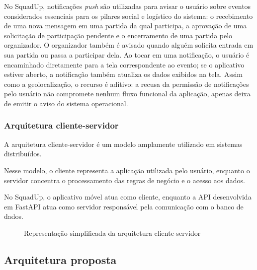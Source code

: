 \documentclass[a4paper, 12pt]{article}
\begin{document}
\begin{justify}
No SquadUp, notificações \textit{push} são utilizadas para avisar o usuário sobre eventos considerados essenciais para os pilares social e logístico do sistema: o recebimento de uma nova mensagem em uma partida da qual participa, a aprovação de uma solicitação de participação pendente e o encerramento de uma partida pelo organizador. O organizador também é avisado quando alguém solicita entrada em sua partida ou passa a participar dela. Ao tocar em uma notificação, o usuário é encaminhado diretamente para a tela correspondente ao evento; se o aplicativo estiver aberto, a notificação também atualiza os dados exibidos na tela. Assim como a geolocalização, o recurso é aditivo: a recusa da permissão de notificações pelo usuário não compromete nenhum fluxo funcional da aplicação, apenas deixa de emitir o aviso do sistema operacional.

\subsubsection{Arquitetura cliente-servidor}

A arquitetura cliente-servidor é um modelo amplamente utilizado em sistemas distribuídos.

Nesse modelo, o cliente representa a aplicação utilizada pelo usuário, enquanto o servidor concentra o processamento das regras de negócio e o acesso aos dados.

No SquadUp, o aplicativo móvel atua como cliente, enquanto a API desenvolvida em FastAPI atua como servidor responsável pela comunicação com o banco de dados.

\begin{figure}[H]
    \centering
    \caption{Representação simplificada da arquitetura cliente-servidor}
    \label{fig:cliente_servidor}
\end{figure}

\subsection{Arquitetura proposta}


\end{justify}
\end{document}
